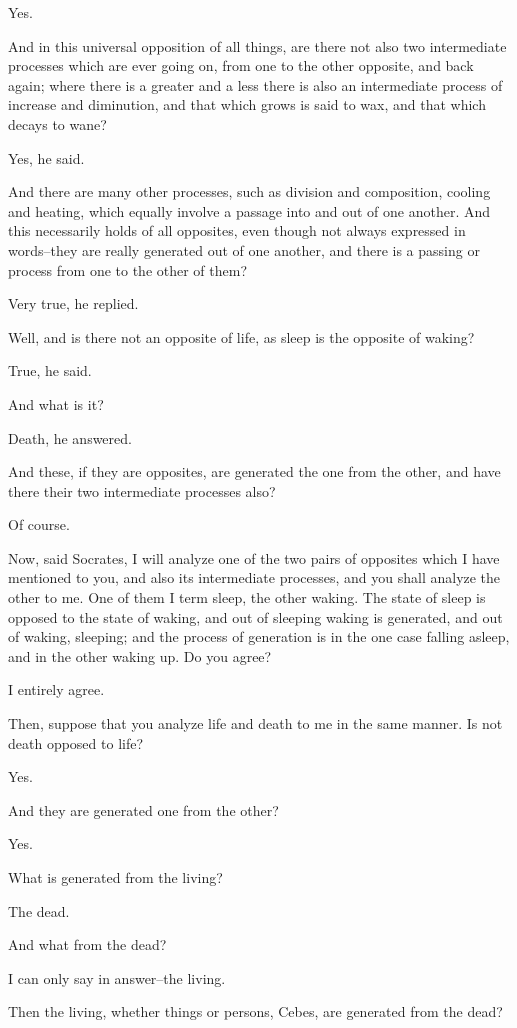 Yes.

And in this universal opposition of all things, are there not also two
intermediate processes which are ever going on, from one to the other
opposite, and back again; where there is a greater and a less there is
also an intermediate process of increase and diminution, and that which
grows is said to wax, and that which decays to wane?

Yes, he said.

And there are many other processes, such as division and composition,
cooling and heating, which equally involve a passage into and out of one
another. And this necessarily holds of all opposites, even though not
always expressed in words--they are really generated out of one another,
and there is a passing or process from one to the other of them?

Very true, he replied.

Well, and is there not an opposite of life, as sleep is the opposite of
waking?

True, he said.

And what is it?

Death, he answered.

And these, if they are opposites, are generated the one from the other,
and have there their two intermediate processes also?

Of course.

Now, said Socrates, I will analyze one of the two pairs of opposites
which I have mentioned to you, and also its intermediate processes, and
you shall analyze the other to me. One of them I term sleep, the other
waking. The state of sleep is opposed to the state of waking, and out
of sleeping waking is generated, and out of waking, sleeping; and the
process of generation is in the one case falling asleep, and in the
other waking up. Do you agree?

I entirely agree.

Then, suppose that you analyze life and death to me in the same manner.
Is not death opposed to life?

Yes.

And they are generated one from the other?

Yes.

What is generated from the living?

The dead.

And what from the dead?

I can only say in answer--the living.

Then the living, whether things or persons, Cebes, are generated from
the dead?

